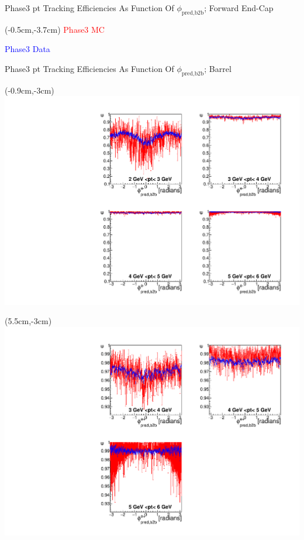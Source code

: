 \documentclass[8pt]{beamer}
\begin{document}
\begin{frame}{Phase3 pt Tracking Efficiencies As Function Of $\phi_{\textrm{pred,b2b}}$; Forward End-Cap}
\begin{textblock*}{6.5cm}
\begin{picture}
		\end{picture}
		
	\end{textblock*}
	
	
	
	\begin{textblock*}{4cm}(-0.5cm,-3.7cm)
		\textcolor{red}{Phase3 MC}
		
		\textcolor{blue}{Phase3 Data}
	\end{textblock*}
	
	
	
	
	
	
	
	
\end{frame}

\begin{frame}{Phase3 pt Tracking Efficiencies As Function Of $\phi_{\textrm{pred,b2b}}$; Barrel}
	
	
	\begin{textblock*}{6.5cm}(-0.9cm,-3cm)
		\includegraphics[width=\textwidth]{VPlots/P3/xPtMPhiemBarrelP3}
	\end{textblock*}
	
	\begin{textblock*}{6.5cm}(5.5cm,-3cm)
		\includegraphics[width=\textwidth]{VPlots/P3/xPtMPhiepBarrelP3}
	\end{textblock*}
	

\end{frame}
\end{document}
